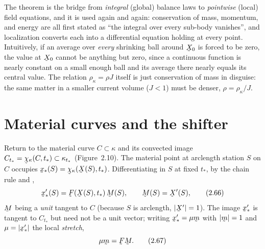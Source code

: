 \begin{remark}\label{rem:localuse}
The theorem is the bridge from \emph{integral} (global) balance laws to
\emph{pointwise} (local) field equations, and it is used again and again:
conservation of mass, momentum, and energy are all first stated as ``the
integral over every sub-body vanishes'', and localization converts each into
a differential equation holding at every point. Intuitively, if an average
over \emph{every} shrinking ball around $\bX_0$ is forced to be zero, the
value at $\bX_0$ cannot be anything but zero, since a continuous function is
nearly constant on a small enough ball and its average there nearly equals
its central value. The relation $\rho_\kappa=\rho J$ itself is just
conservation of mass in disguise: the same matter in a smaller current
volume ($J<1$) must be denser, $\rho=\rho_\kappa/J$.
\end{remark}

\section{Material curves and the shifter}\label{sec:shifter}

Return to the material curve $C\subset\kappa$ and its convected image
$C_{t_*}=\bchi_\kappa(C,t_*)\subset\kappa_{t_*}$ (Figure~2.10). The material
point at arclength station $S$ on $C$ occupies $\bx_*(S)=\bchi_\kappa(\bX(S),t_*)$.
Differentiating in $S$ at fixed $t_*$, by the chain rule and ,
\begin{equation}
   \bx_*'(S)=\bF(\bX(S),t_*)\,\bM(S),\qquad \bM(S)=\bX'(S), \tag{2.66}\label{eq:2.66}
\end{equation}
$\bM$ being a \emph{unit} tangent to $C$ (because $S$ is arclength,
$|\bX'|=1$). The image $\bx_*'$ is tangent to $C_{t_*}$ but need not be a
unit vector; writing $\bx_*'=\mu\bmm$ with $|\bmm|=1$ and $\mu=|\bx_*'|$ the
local \emph{stretch},
\begin{equation}
   \mu\bmm=\bF\bM. \tag{2.67}\label{eq:2.67}
\end{equation}

